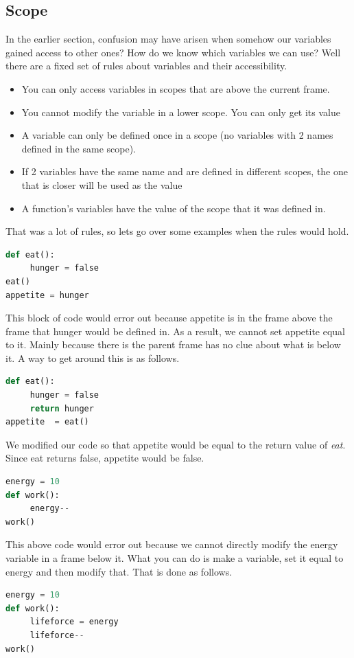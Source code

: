 \documentclass{article}
\begin{document}
 \subsection{Scope}
 In the earlier section, confusion may have arisen when somehow our variables gained access to other ones? How do we know which variables we can use? Well there are a fixed set of rules about variables and their accessibility.
\begin{itemize}
\item You can only access variables in scopes that are above the current frame. 
\item You cannot modify the variable in a lower scope. You can only get its value
\item A variable can only be defined once in a scope (no variables with 2 names defined in the same scope).
\item If 2 variables have the same name and are defined in different scopes, the one that is closer will be used as the value
\item A function's variables have the value of the scope that it was defined in.
\end{itemize}
That was a lot of rules, so lets go over some examples when the rules would hold. 
\begin{lstlisting}[language = Python]
def eat():
     hunger = false
eat()
appetite = hunger
\end{lstlisting}
This block of code would error out because appetite is in the frame above the frame that hunger would be defined in. As a result, we cannot set appetite equal to it. Mainly because there is the parent frame has no clue about what is below it. A way to get around this is as follows. 
\begin{lstlisting}[language = Python]
def eat():
     hunger = false
     return hunger
appetite  = eat()
\end{lstlisting}
We modified our code so that appetite would be equal to the return value of \emph{eat}. Since eat returns false, appetite would be false. 
\begin{lstlisting}[language = Python]
energy = 10
def work():
     energy--
work()
\end{lstlisting}
This above code would error out because we cannot directly modify the energy variable in a frame below it. What you can do is make a variable, set it equal to energy and then modify that. That is done as follows. 
\begin{lstlisting}[language = Python]
energy = 10
def work():
     lifeforce = energy
     lifeforce--
work()
\end{lstlisting}
\end{document}
